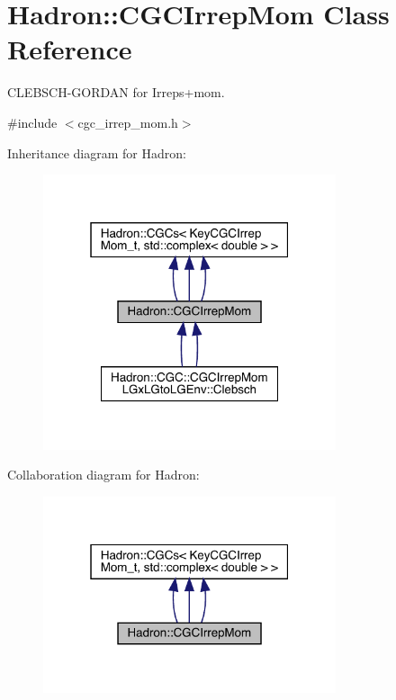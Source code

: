 \hypertarget{classHadron_1_1CGCIrrepMom}{}\section{Hadron\+:\+:C\+G\+C\+Irrep\+Mom Class Reference}
\label{classHadron_1_1CGCIrrepMom}


C\+L\+E\+B\+S\+C\+H-\/\+G\+O\+R\+D\+AN for Irreps+mom.  




{\ttfamily \#include $<$cgc\+\_\+irrep\+\_\+mom.\+h$>$}



Inheritance diagram for Hadron\+:
\nopagebreak
\begin{figure}[H]
\begin{center}
\leavevmode
\includegraphics[width=244pt]{df/d13/classHadron_1_1CGCIrrepMom__inherit__graph}
\end{center}
\end{figure}


Collaboration diagram for Hadron\+:
\nopagebreak
\begin{figure}[H]
\begin{center}
\leavevmode
\includegraphics[width=244pt]{d9/dea/classHadron_1_1CGCIrrepMom__coll__graph}
\end{center}
\end{figure}
